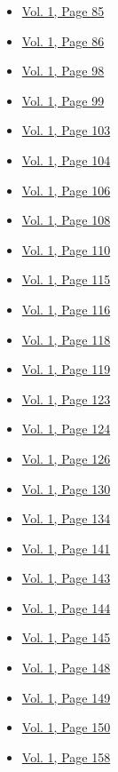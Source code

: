 \begin{itemize}
\begin{itemize}
  \item
    \protect\hyperlink{g-page-93}{Vol. 1, Page 85}
  \item
    \protect\hyperlink{g-page-94}{Vol. 1, Page 86}
  \item
    \protect\hyperlink{g-page-106}{Vol. 1, Page 98}
  \item
    \protect\hyperlink{g-page-107}{Vol. 1, Page 99}
  \item
    \protect\hyperlink{g-page-111}{Vol. 1, Page 103}
  \item
    \protect\hyperlink{g-page-112}{Vol. 1, Page 104}
  \item
    \protect\hyperlink{g-page-114}{Vol. 1, Page 106}
  \item
    \protect\hyperlink{g-page-116}{Vol. 1, Page 108}
  \item
    \protect\hyperlink{g-page-118}{Vol. 1, Page 110}
  \item
    \protect\hyperlink{g-page-123}{Vol. 1, Page 115}
  \item
    \protect\hyperlink{g-page-124}{Vol. 1, Page 116}
  \item
    \protect\hyperlink{g-page-126}{Vol. 1, Page 118}
  \item
    \protect\hyperlink{g-page-127}{Vol. 1, Page 119}
  \item
    \protect\hyperlink{g-page-131}{Vol. 1, Page 123}
  \item
    \protect\hyperlink{g-page-132}{Vol. 1, Page 124}
  \item
    \protect\hyperlink{g-page-134}{Vol. 1, Page 126}
  \item
    \protect\hyperlink{g-page-138}{Vol. 1, Page 130}
  \item
    \protect\hyperlink{g-page-142}{Vol. 1, Page 134}
  \item
    \protect\hyperlink{g-page-149}{Vol. 1, Page 141}
  \item
    \protect\hyperlink{g-page-151}{Vol. 1, Page 143}
  \item
    \protect\hyperlink{g-page-152}{Vol. 1, Page 144}
  \item
    \protect\hyperlink{g-page-153}{Vol. 1, Page 145}
  \item
    \protect\hyperlink{g-page-156}{Vol. 1, Page 148}
  \item
    \protect\hyperlink{g-page-157}{Vol. 1, Page 149}
  \item
    \protect\hyperlink{g-page-158}{Vol. 1, Page 150}
  \item
    \protect\hyperlink{g-page-166}{Vol. 1, Page 158}

\end{itemize}
\end{itemize}
